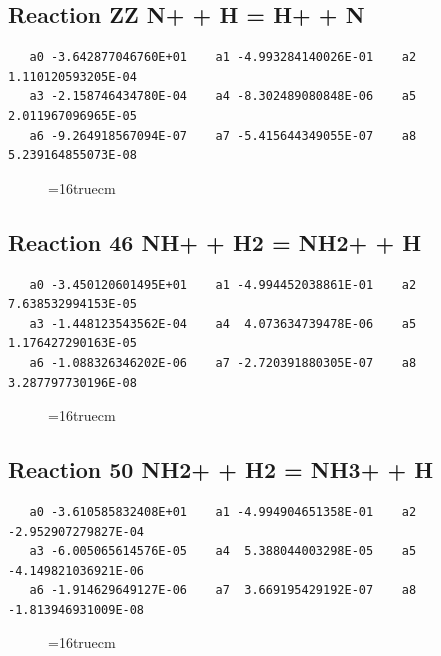 \documentclass[12pt]{article}
\begin{document}
\subsection{
Reaction ZZ N+ + H = H+ + N}
\begin{small}\begin{verbatim}
   a0 -3.642877046760E+01    a1 -4.993284140026E-01    a2  1.110120593205E-04
   a3 -2.158746434780E-04    a4 -8.302489080848E-06    a5  2.011967096965E-05
   a6 -9.264918567094E-07    a7 -5.415644349055E-07    a8  5.239164855073E-08
   \end{verbatim}\end{small}
\begin{figure}[h!] \label{n2rates}
\epsfxsize=16truecm
\end{figure}
\newpage

\subsection{
Reaction 46 NH+ + H2 = NH2+ + H}
\begin{small}\begin{verbatim}
   a0 -3.450120601495E+01    a1 -4.994452038861E-01    a2  7.638532994153E-05
   a3 -1.448123543562E-04    a4  4.073634739478E-06    a5  1.176427290163E-05
   a6 -1.088326346202E-06    a7 -2.720391880305E-07    a8  3.287797730196E-08
   \end{verbatim}\end{small}
\begin{figure}[h!] \label{n2rates}
\epsfxsize=16truecm
\end{figure}
\newpage

\subsection{
Reaction 50 NH2+ + H2 = NH3+ + H}
\begin{small}\begin{verbatim}
   a0 -3.610585832408E+01    a1 -4.994904651358E-01    a2 -2.952907279827E-04
   a3 -6.005065614576E-05    a4  5.388044003298E-05    a5 -4.149821036921E-06
   a6 -1.914629649127E-06    a7  3.669195429192E-07    a8 -1.813946931009E-08
   \end{verbatim}\end{small}
\begin{figure}[h!] \label{n2rates}
\epsfxsize=16truecm
\end{figure}
\newpage
\end{document}
